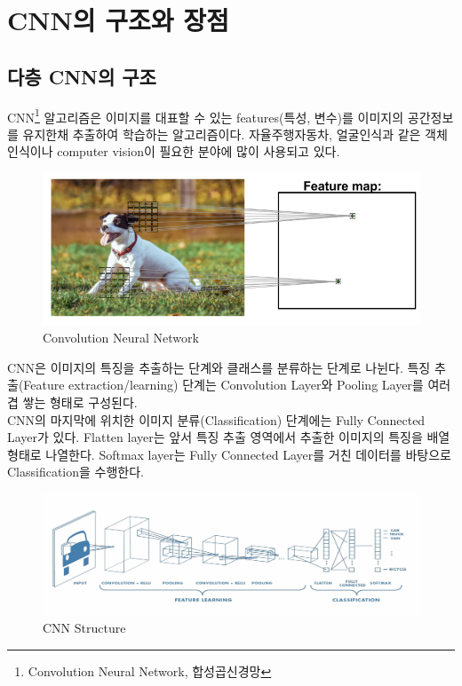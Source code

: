 \section{CNN의 구조와 장점}
\subsection{다층 CNN의 구조}
    CNN\footnote{Convolution Neural Network, 합성곱신경망} 알고리즘은 이미지를 대표할 수 있는 features(특성, 변수)를 이미지의 공간정보를 유지한채 추출하여 학습하는 알고리즘이다. 자율주행자동차, 얼굴인식과 같은 객체인식이나 computer vision이 필요한 분야에 많이 사용되고 있다. \\
    \vspace{-4mm}
    \begin{figure}[!h]\centering
		\includegraphics[width=.65\textwidth]{image/week04/2-1.png}
		\caption{\small Convolution Neural Network}
		\vspace{-10pt}
    \end{figure}
    
    CNN은 이미지의 특징을 추출하는 단계와 클래스를 분류하는 단계로 나뉜다. 특징 추출(Feature extraction/learning) 단계는 Convolution Layer와 Pooling Layer를 여러 겹 쌓는 형태로 구성된다. \\
    CNN의 마지막에 위치한 이미지 분류(Classification) 단계에는 Fully Connected Layer가 있다. Flatten layer는 앞서 특징 추출 영역에서 추출한 이미지의 특징을 배열 형태로 나열한다. Softmax layer는 Fully Connected Layer를 거친 데이터를 바탕으로 Classification을 수행한다.
    \vspace{-4mm}
    \begin{figure}[!h]\centering
		\includegraphics[width=.65\textwidth]{image/week04/2-2.png}
		\caption{\small CNN Structure}
		\vspace{-10pt}
    \end{figure}
    
